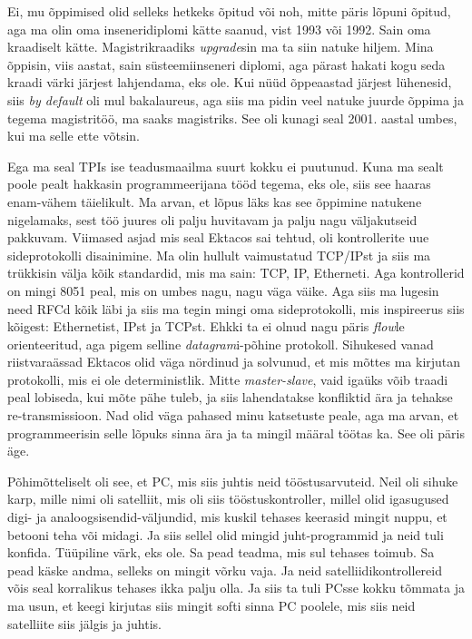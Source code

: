 Ei, mu õppimised olid selleks hetkeks õpitud või noh, mitte päris lõpuni 
õpitud, aga ma olin oma inseneridiplomi kätte saanud, vist 1993 või 1992. Sain 
oma kraadiselt kätte. Magistrikraadiks \emph{upgrade}sin ma ta siin natuke 
hiljem. Mina õppisin, viis aastat, sain süsteemiinseneri diplomi, aga pärast 
hakati  kogu seda kraadi värki järjest lahjendama, eks ole. Kui nüüd õppeaastad 
järjest lühenesid, siis \emph{by default} oli mul bakalaureus, aga siis ma 
pidin veel natuke juurde õppima ja tegema magistritöö, ma saaks magistriks. See 
oli kunagi seal 2001. aastal umbes, kui ma selle  ette võtsin. 


Ega ma seal TPIs ise teadusmaailma suurt kokku ei puutunud. Kuna ma sealt poole 
pealt hakkasin programmeerijana tööd tegema, eks ole, siis see  haaras  
enam-vähem täielikult. Ma arvan, et lõpus läks kas see õppimine natukene 
nigelamaks, sest töö juures oli palju huvitavam ja palju nagu väljakutseid 
pakkuvam. Viimased asjad mis seal Ektacos sai tehtud, oli 
kontrollerite uue sideprotokolli disainimine. Ma olin hullult vaimustatud 
TCP/IPst ja  siis ma trükkisin välja kõik standardid, mis ma sain: TCP, IP, 
Etherneti. Aga kontrollerid on mingi 8051 peal, mis on umbes nagu, nagu väga 
väike. Aga siis ma lugesin need RFCd kõik läbi ja siis ma tegin mingi oma 
sideprotokolli, mis inspireerus siis kõigest: Ethernetist, IPst ja TCPst. Ehkki 
ta ei olnud nagu päris \emph{flow}le orienteeritud, aga pigem  selline 
\emph{datagram}i-põhine protokoll. Sihukesed vanad riistvaraässad Ektacos  olid 
väga nördinud ja solvunud, et mis mõttes ma kirjutan protokolli, mis ei ole 
deterministlik. Mitte \emph{master-slave}, vaid igaüks võib traadi peal 
lobiseda, kui mõte pähe tuleb, ja siis lahendatakse konfliktid ära ja tehakse 
re-transmissioon. Nad olid väga pahased minu katsetuste peale, aga ma arvan, et 
programmeerisin selle lõpuks sinna ära ja ta mingil määral töötas ka. See oli 
päris äge.


Põhimõtteliselt oli see, et PC, mis siis juhtis neid tööstusarvuteid. Neil oli 
sihuke karp, mille nimi oli satelliit, mis oli siis tööstuskontroller, millel 
olid igasugused digi- ja analoogsisendid-väljundid, mis kuskil tehases keerasid 
mingit nuppu, et betooni teha või midagi. Ja siis sellel olid mingid
juht-programmid ja neid tuli konfida. Tüüpiline värk, eks ole. Sa pead teadma, mis 
sul tehases toimub. Sa pead käske andma, selleks on mingit võrku vaja. Ja neid 
satelliidikontrollereid võis seal korralikus tehases ikka palju olla. Ja siis 
ta tuli PCsse kokku tõmmata ja ma usun, et keegi kirjutas siis mingit softi 
sinna PC poolele, mis siis neid satelliite siis jälgis ja juhtis.

